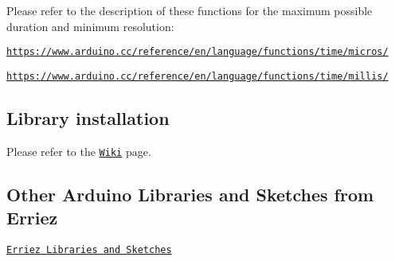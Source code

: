 Please refer to the description of these functions for the maximum possible duration and minimum resolution\+:


\begin{DoxyItemize}
\item \href{https://www.arduino.cc/reference/en/language/functions/time/micros/}{\tt https\+://www.\+arduino.\+cc/reference/en/language/functions/time/micros/}
\item \href{https://www.arduino.cc/reference/en/language/functions/time/millis/}{\tt https\+://www.\+arduino.\+cc/reference/en/language/functions/time/millis/}
\end{DoxyItemize}

\subsection*{Library installation}

Please refer to the \href{https://github.com/Erriez/ErriezArduinoLibrariesAndSketches/wiki}{\tt Wiki} page.

\subsection*{Other Arduino Libraries and Sketches from Erriez}


\begin{DoxyItemize}
\item \href{https://github.com/Erriez/ErriezArduinoLibrariesAndSketches}{\tt Erriez Libraries and Sketches} 
\end{DoxyItemize}